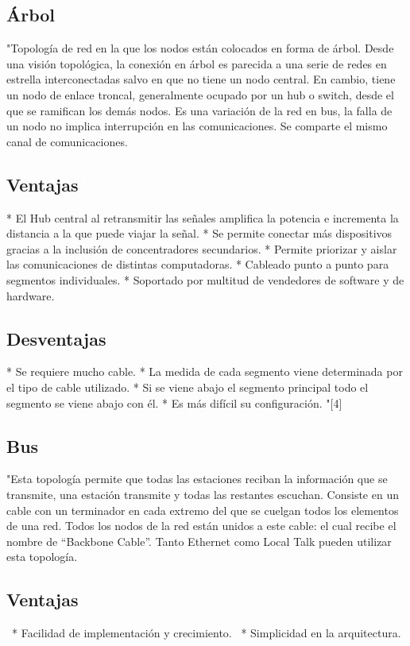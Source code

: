 \documentclass{bmcart}
\begin{document}
\subsection*{Árbol} 
"Topología de red en la que los nodos están colocados en forma de árbol. Desde una visión
topológica, la conexión en árbol es parecida a una serie de redes en estrella interconectadas salvo
en que no tiene un nodo central. En cambio, tiene un nodo de enlace troncal, generalmente
ocupado por un hub o switch, desde el que se ramifican los demás nodos. Es una variación de la
red en bus, la falla de un nodo no implica interrupción en las comunicaciones. Se comparte el
mismo canal de comunicaciones.
\subsection*{Ventajas}

* El Hub central al retransmitir las señales amplifica la potencia e incrementa la distancia a la
que puede viajar la señal.
* Se permite conectar más dispositivos gracias a la inclusión de concentradores secundarios.
* Permite priorizar y aislar las comunicaciones de distintas computadoras.
* Cableado punto a punto para segmentos individuales.
* Soportado por multitud de vendedores de software y de hardware.
\subsection*{Desventajas}

* Se requiere mucho cable.
* La medida de cada segmento viene determinada por el tipo de cable utilizado.
* Si se viene abajo el segmento principal todo el segmento se viene abajo con él.
* Es más difícil su configuración.
"[4]
\subsection*{Bus} 
"Esta topología permite que todas las estaciones reciban la información que se transmite, una
estación transmite y todas las restantes escuchan. Consiste en un cable con un terminador en cada
extremo del que se cuelgan todos los elementos de una red. Todos los nodos de la red están
unidos a este cable: el cual recibe el nombre de “Backbone Cable”. Tanto Ethernet como Local Talk
pueden utilizar esta topología.
\subsection*{Ventajas}
 * Facilidad de implementación y crecimiento.
 * Simplicidad en la arquitectura.
\end{document}
